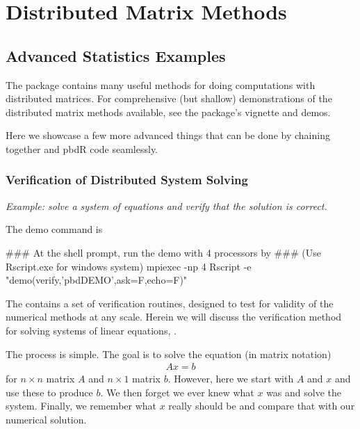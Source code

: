 \part{Distributed Matrix Methods}
\label{part:dmat}


\chapter{Advanced Statistics Examples}

The  package contains many useful methods for doing computations with distributed matrices.  For comprehensive (but shallow) demonstrations of the distributed matrix methods available, see the  package's vignette and demos.

Here we showcase a few more advanced things that can be done by chaining together  and pbdR code seamlessly.

\section{Verification of Distributed System Solving}

\emph{Example:  solve a system of equations and verify that the solution is correct.}

The demo command is
\begin{Command}
### At the shell prompt, run the demo with 4 processors by
### (Use Rscript.exe for windows system)
mpiexec -np 4 Rscript -e "demo(verify,'pbdDEMO',ask=F,echo=F)"
\end{Command}

The  contains a set of verification routines, designed to test for validity of the numerical methods at any scale.  Herein we will discuss the verification method for solving systems of linear equations, .

The process is simple.  The goal is to solve the equation (in matrix notation)
\begin{align*}
Ax=b
\end{align*}
for $n\times n$ matrix $A$ and $n\times 1$ matrix $b$.  However, here we start with $A$ and $x$ and use these to produce $b$.  We then forget we ever knew what $x$ was and solve the system.  Finally, we remember what $x$ really should be and compare that with our numerical solution.
  
